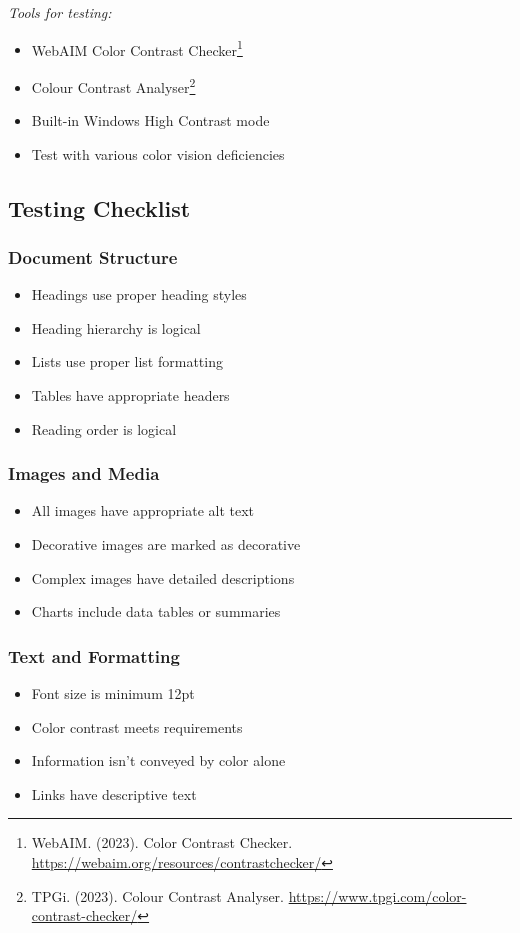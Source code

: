 \emph{Tools for testing:}
\begin{itemize}
\item WebAIM Color Contrast Checker\footnote{WebAIM. (2023). Color Contrast Checker. \url{https://webaim.org/resources/contrastchecker/}}
\item Colour Contrast Analyser\footnote{TPGi. (2023). Colour Contrast Analyser. \url{https://www.tpgi.com/color-contrast-checker/}}
\item Built-in Windows High Contrast mode
\item Test with various color vision deficiencies
\end{itemize}

\subsection{Testing Checklist}

\subsubsection{Document Structure}
\begin{itemize}
\item[\checkmark] Headings use proper heading styles
\item[\checkmark] Heading hierarchy is logical
\item[\checkmark] Lists use proper list formatting
\item[\checkmark] Tables have appropriate headers
\item[\checkmark] Reading order is logical
\end{itemize}

\subsubsection{Images and Media}
\begin{itemize}
\item[\checkmark] All images have appropriate alt text
\item[\checkmark] Decorative images are marked as decorative
\item[\checkmark] Complex images have detailed descriptions
\item[\checkmark] Charts include data tables or summaries
\end{itemize}

\subsubsection{Text and Formatting}
\begin{itemize}
\item[\checkmark] Font size is minimum 12pt
\item[\checkmark] Color contrast meets requirements
\item[\checkmark] Information isn't conveyed by color alone
\item[\checkmark] Links have descriptive text
\end{itemize}

